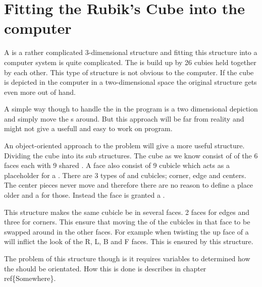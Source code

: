 \chapter{Fitting the Rubik's Cube into the computer}
A \rubik{} is a rather complicated 3-dimensional structure and fitting this structure into a computer system is quite complicated. The \rubik{} is build up by 26 cubies held together by each other. This type of structure is not obvious to the computer. If the cube is depicted in the computer in a two-dimensional space the original \rubik{} structure gets even more out of hand. 

A simple way though to handle the \rubik{} in the program is a two dimensional depiction and simply move the \facelet{}s around. But this approach will be far from reality and might not give a usefull and easy to work on program. 

An object-oriented approach to the problem will give a more useful structure. Dividing the cube into its sub structures. The cube as we know consist of of the 6 faces each with 9 shared \cpiece{}. A face also consist of 9 cubicle which acts as a placeholder for a  \cpiece{}. There are 3 types of \cpiece{} and cubicles; corner, edge and centers. The center pieces never move and therefore there are no reason to define a place older and a \cipeice{} for those. Instead the face is granted a \facelet{}.

This structure makes the same cubicle be in several faces. 2 faces for edges and three for corners. This ensure that moving the \cpiece{} of the cubicles in that face to be swapped around in the other faces. For example when twisting the up face of a \rubik{} will inflict the look of the R, L, B and F faces. This is ensured by this structure. 

The problem of this structure though is it requires variables to determined how the \facelet{} should be orientated. How this is done is describes in chapter ref\{Somewhere\}.
